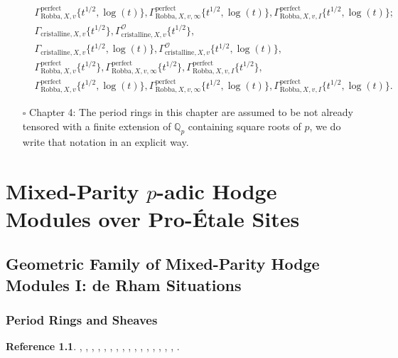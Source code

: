 \documentclass[12pt]{book}
\theoremstyle{definition}
\newtheorem{reference}{Reference}
\begin{document}
\begin{itemize}
\begin{align}
&\Gamma^\mathrm{perfect}_{\text{Robba},X,v}\{t^{1/2},\log(t)\},\Gamma^\mathrm{perfect}_{\text{Robba},X,v,\infty}\{t^{1/2},\log(t)\},\Gamma^\mathrm{perfect}_{\text{Robba},X,v,I}\{t^{1/2},\log(t)\};
\end{align}
\begin{align}
&\Gamma_{\text{cristalline},X,v}\{t^{1/2}\},\Gamma^\mathcal{O}_{\text{cristalline},X,v}\{t^{1/2}\},\\
&\Gamma_{\text{cristalline},X,v}\{t^{1/2},\log(t)\},\Gamma^\mathcal{O}_{\text{cristalline},X,v}\{t^{1/2},\log(t)\},\\
&\Gamma^\mathrm{perfect}_{\text{Robba},X,v}\{t^{1/2}\},\Gamma^\mathrm{perfect}_{\text{Robba},X,v,\infty}\{t^{1/2}\},\Gamma^\mathrm{perfect}_{\text{Robba},X,v,I}\{t^{1/2}\},\\
&\Gamma^\mathrm{perfect}_{\text{Robba},X,v}\{t^{1/2},\log(t)\},\Gamma^\mathrm{perfect}_{\text{Robba},X,v,\infty}\{t^{1/2},\log(t)\},\Gamma^\mathrm{perfect}_{\text{Robba},X,v,I}\{t^{1/2},\log(t)\}.
\end{align} 
\item[$\square$] Chapter 4: The period rings in this chapter are assumed to be not already tensored with a finite extension of $\mathbb{Q}_p$ containing square roots of $p$,  we do write that notation in an explicit way.
\end{itemize}




\chapter{Mixed-Parity $p$-adic Hodge Modules over Pro-\'Etale Sites}



\newpage
\section{Geometric Family of Mixed-Parity Hodge Modules I: de Rham Situations}


\subsection{Period Rings and Sheaves}


\begin{reference}
\cite{Sch1}, \cite{KL1}, \cite{KL2}, \cite{BL1}, \cite{BL2}, \cite{BS}, \cite{BHS}, \cite{Fon1}, \cite{CS1}, \cite{CS2}, \cite{BK}, \cite{BBK}, \cite{BBBK}, \cite{KKM}, \cite{KM}, \cite{LZ}, \cite{M}.
\end{reference}
\end{document}
